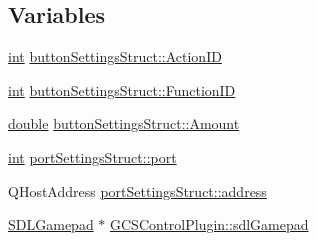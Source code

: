 \subsection*{Variables}
\begin{DoxyCompactItemize}
\item 
\hyperlink{ioapi_8h_a787fa3cf048117ba7123753c1e74fcd6}{int} \hyperlink{group___g_c_s_control_gadget_plugin_ga03093dd46af520daf9f990be1e2fe9c6}{button\-Settings\-Struct\-::\-Action\-I\-D}
\item 
\hyperlink{ioapi_8h_a787fa3cf048117ba7123753c1e74fcd6}{int} \hyperlink{group___g_c_s_control_gadget_plugin_ga0cf7694f3cc910d158e54851d077dd22}{button\-Settings\-Struct\-::\-Function\-I\-D}
\item 
\hyperlink{_super_l_u_support_8h_a8956b2b9f49bf918deed98379d159ca7}{double} \hyperlink{group___g_c_s_control_gadget_plugin_gaaa14aa6512e6e46a95fcfd01c675cbf7}{button\-Settings\-Struct\-::\-Amount}
\item 
\hyperlink{ioapi_8h_a787fa3cf048117ba7123753c1e74fcd6}{int} \hyperlink{group___g_c_s_control_gadget_plugin_ga0f8fc6e0cdd5eac4d00a2b169f94c7a3}{port\-Settings\-Struct\-::port}
\item 
Q\-Host\-Address \hyperlink{group___g_c_s_control_gadget_plugin_ga4a1de1267a23f01dad6562a23ddf70f8}{port\-Settings\-Struct\-::address}
\item 
\hyperlink{class_s_d_l_gamepad}{S\-D\-L\-Gamepad} $\ast$ \hyperlink{group___g_c_s_control_gadget_plugin_ga3cd3b8ed3b17b5405fb2f71803a65951}{G\-C\-S\-Control\-Plugin\-::sdl\-Gamepad}
\end{DoxyCompactItemize}
